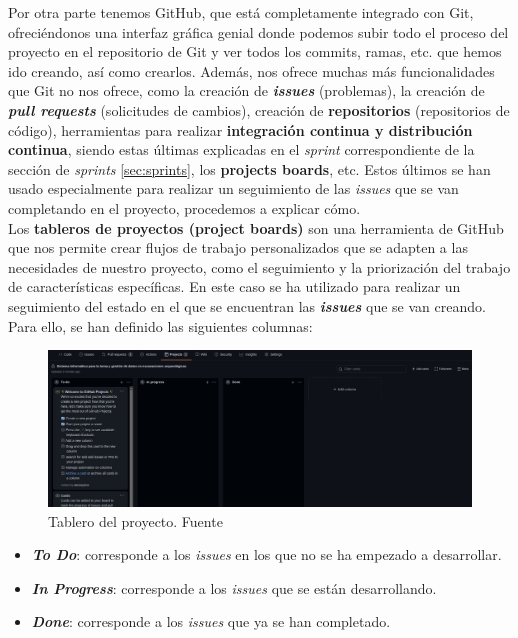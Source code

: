 Por otra parte tenemos GitHub, que está completamente integrado con Git, ofreciéndonos una
interfaz gráfica genial donde podemos subir todo el proceso del proyecto en el repositorio
de Git y ver todos los commits, ramas, etc. que hemos ido creando, así como crearlos.
Además, nos ofrece muchas más funcionalidades que Git no nos ofrece, como la creación de
\textbf{\textit{issues}} (problemas), la creación de \textbf{\textit{pull requests}}
(solicitudes de cambios), creación de \textbf{repositorios} (repositorios de código),
herramientas para realizar \textbf{integración continua y distribución continua}, siendo
estas últimas explicadas en el \textit{sprint} correspondiente de la sección de
\textit{sprints} \ref{sec:sprints}, los \textbf{projects boards}, etc. Estos últimos se han
usado especialmente para realizar un seguimiento de las \textit{issues} que se van
completando en el proyecto, procedemos a explicar cómo.\\

Los \textbf{tableros de proyectos (project boards)} \cite{project-boards} son una
herramienta de GitHub que nos permite crear flujos de trabajo personalizados que se adapten
a las necesidades de nuestro proyecto, como el seguimiento y la priorización del trabajo de
características específicas. En este caso se ha utilizado para realizar un seguimiento
del estado en el que se encuentran las \textbf{\textit{issues}} que se van creando. Para
ello, se han definido las siguientes columnas:

    \begin{figure}[H]
        \centering
        \includegraphics[scale=0.19]{imagenes/project-board.png}
        \caption[Tablero del proyecto]{Tablero del proyecto. Fuente \cite{project-board-image}}
        \label{fig:project-board}
    \end{figure}

    \begin{itemize}
        \item \textbf{\textit{To Do}}: corresponde a los \textit{issues} en los que no se ha
        empezado a desarrollar.
        \item \textbf{\textit{In Progress}}: corresponde a los \textit{issues} que se están
        desarrollando.
        \item \textbf{\textit{Done}}: corresponde a los \textit{issues} que ya se han
        completado.
    \end{itemize}

